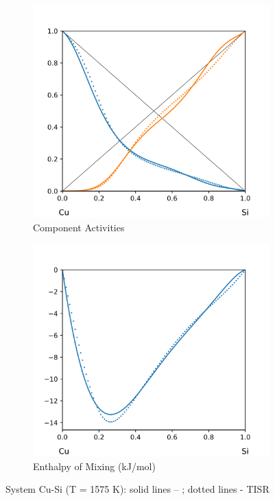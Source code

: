 \documentclass[12pt,abstract]{scrartcl}
\begin{document}
\begin{figure}
\centering
\begin{subfigure}{.5\textwidth}
  \centering
  \includegraphics[width=1\linewidth]{Cu-Si2_Activity}
  \caption{Component Activities}
  \label{fig:sub1}
\end{subfigure}%
\begin{subfigure}{.5\textwidth}
  \centering
  \includegraphics[width=1\linewidth]{Cu-Si2_Enthalpy}
  \caption{Enthalpy of Mixing (kJ/mol)}
  \label{fig:sub2}
\end{subfigure}
\caption{System Cu-Si (T = 1575 K): solid lines -- \cite{Cu-Si2_Data}; dotted lines - TISR} 
\label{fig:Cu-Si2}   
\end{figure}
\end{document}
